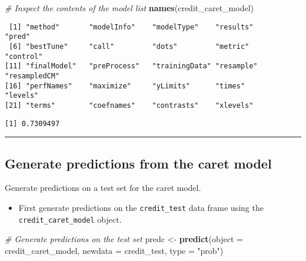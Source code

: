 \documentclass[
]{book}
\newenvironment{Shaded}{\begin{snugshade}}{\end{snugshade}}
\newcommand{\CommentTok}[1]{\textcolor[rgb]{0.56,0.35,0.01}{\textit{#1}}}
\newcommand{\DataTypeTok}[1]{\textcolor[rgb]{0.13,0.29,0.53}{#1}}
\newcommand{\KeywordTok}[1]{\textcolor[rgb]{0.13,0.29,0.53}{\textbf{#1}}}
\newcommand{\NormalTok}[1]{#1}
\newcommand{\OperatorTok}[1]{\textcolor[rgb]{0.81,0.36,0.00}{\textbf{#1}}}
\newcommand{\StringTok}[1]{\textcolor[rgb]{0.31,0.60,0.02}{#1}}
\providecommand{\tightlist}{%
  \setlength{\itemsep}{0pt}\setlength{\parskip}{0pt}}
\begin{document}
\begin{Shaded}
\begin{Highlighting}[]
\CommentTok{# Inspect the contents of the model list }
\KeywordTok{names}\NormalTok{(credit_caret_model)}
\end{Highlighting}
\end{Shaded}

\begin{verbatim}
 [1] "method"       "modelInfo"    "modelType"    "results"      "pred"        
 [6] "bestTune"     "call"         "dots"         "metric"       "control"     
[11] "finalModel"   "preProcess"   "trainingData" "resample"     "resampledCM" 
[16] "perfNames"    "maximize"     "yLimits"      "times"        "levels"      
[21] "terms"        "coefnames"    "contrasts"    "xlevels"     
\end{verbatim}

\begin{Shaded}
\end{Shaded}

\begin{verbatim}
[1] 0.7309497
\end{verbatim}

\begin{center}\rule{0.5\linewidth}{0.5pt}\end{center}

\hypertarget{generate-predictions-from-the-caret-model}{%
\subsection{Generate predictions from the caret model}\label{generate-predictions-from-the-caret-model}}

Generate predictions on a test set for the caret model.

\begin{itemize}
\tightlist
\item
  First generate predictions on the \texttt{credit\_test} data frame using the \texttt{credit\_caret\_model} object.
\end{itemize}

\begin{Shaded}
\begin{Highlighting}[]
\CommentTok{# Generate predictions on the test set}
\NormalTok{predc <-}\StringTok{ }\KeywordTok{predict}\NormalTok{(}\DataTypeTok{object =}\NormalTok{ credit_caret_model, }
                \DataTypeTok{newdata =}\NormalTok{ credit_test,}
                \DataTypeTok{type =} \StringTok{"prob"}\NormalTok{)}
\end{Highlighting}
\end{Shaded}
\end{document}
